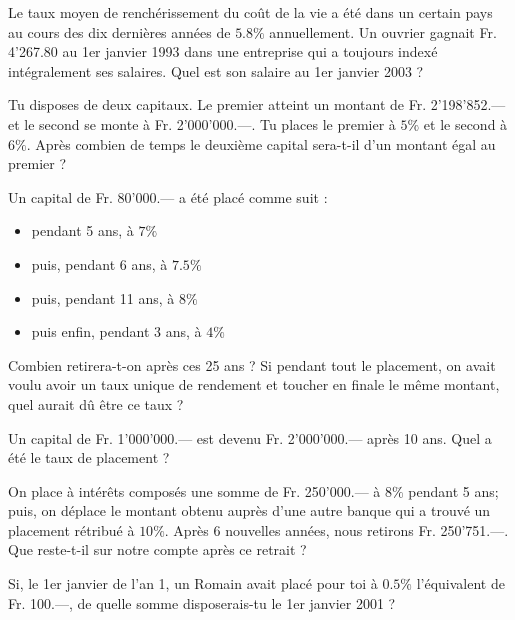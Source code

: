 \begin{exercice}
Le taux moyen de renchérissement du coût de la vie a été dans un certain pays au cours des dix dernières années de $5.8 \%$ annuellement. Un ouvrier gagnait Fr. 4'267.80 au 1er janvier 1993 dans une entreprise qui a toujours indexé intégralement ses salaires. Quel est son salaire au 1er janvier 2003 ?
\end{exercice}

\begin{exercice}
Tu disposes de deux capitaux. Le premier atteint un montant de Fr. 2'198'852.— et le second se monte à Fr. 2’000'000.—. Tu places le premier à $5 \%$ et le second à $6 \%$. Après combien de temps le deuxième capital sera-t-il d’un montant égal au premier ?
\end{exercice}

\begin{exercice}
Un capital de Fr. 80'000.— a été placé comme suit :
\begin{itemize}
\item pendant  5 ans,  à $7 \%$
\item puis, pendant 6 ans, à $7.5 \%$
\item puis, pendant 11 ans, à $8 \%$
\item puis enfin, pendant 3 ans, à $4 \%$
\end{itemize}
Combien retirera-t-on après ces 25 ans ? Si pendant tout le placement, on avait voulu avoir un taux unique de rendement et toucher en finale le même montant, quel aurait dû être ce taux ?
\end{exercice}

\begin{exercice}
Un capital de Fr. 1'000'000.— est devenu Fr. 2'000'000.— après 10 ans. Quel a été le taux de placement ?
\end{exercice}

\begin{exercice}
On place à intérêts composés une somme de Fr. 250'000.— à $8 \%$ pendant 5 ans; puis, on déplace le montant obtenu auprès d’une autre banque qui a trouvé un placement rétribué à $10 \%$. Après 6 nouvelles années, nous retirons Fr. 250'751.—. Que reste-t-il sur notre compte après ce retrait ?
\end{exercice}

\begin{exercice}
Si, le 1er janvier de l'an 1, un Romain avait placé pour toi à $0.5 \%$ l’équivalent de Fr. 100.—, de quelle somme disposerais-tu le 1er janvier 2001 ?
\end{exercice}

